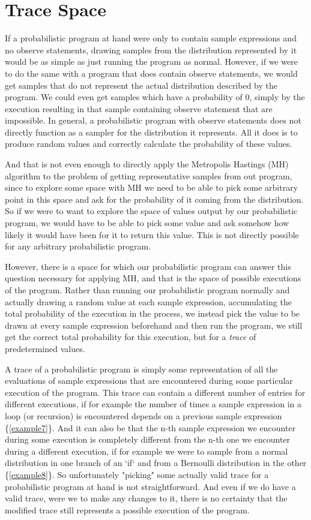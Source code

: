 \section{Trace Space}

If a probabilistic program at hand were only to contain sample expressions and no observe statements, drawing samples from the distribution represented by it would be as simple as just running the program as normal. However, if we were to do the same with a program that does contain observe statements, we would get samples that do not represent the actual distribution described by the program. We could even get samples which have a probability of $0$, simply by the execution resulting in that sample containing observe statement that are impossible. In general, a probabilistic program with observe statements does not directly function as a sampler for the distribution it represents. All it does is to produce random values and correctly calculate the probability of these values.

And that is not even enough to directly apply the Metropolis Hastings (MH) algorithm to the problem of getting representative samples from out program, since to explore some space with MH we need to be able to pick some arbitrary point in this space and ask for the probability of it coming from the distribution. So if we were to want to explore the space of values output by our probabilistic program, we would have to be able to pick some value and ask somehow how likely it would have been for it to return this value. This is not directly possible for any arbitrary probabilistic program.

However, there is a space for which our probabilistic program can answer this question necessary for applying MH, and that is the space of possible executions of the program. Rather than running our probabilistic program normally and actually drawing a random value at each sample expression, accumulating the total probability of the execution in the process, we instead pick the value to be drawn at every sample expression beforehand and then run the program, we still get the correct total probability for this execution, but for a \textit{trace} of predetermined values.

A trace of a probabilistic program is simply some representation of all the evaluations of sample expressions that are encountered during some particular execution of the program. This trace can contain a different number of entries for different executions, if for example the number of times a sample expression in a loop (or recursion) is encountered depends on a previous sample expression \{\ref{example7}\}. And it can also be that the n-th sample expression we encounter during some execution is completely different from the n-th one we encounter during a different execution, if for example we were to sample from a normal distribution in one branch of an `if` and from a Bernoulli distribution in the other \{\ref{example8}\}. So unfortunately "picking" some actually valid trace for a probabilistic program at hand is not straightforward. And even if we do have a valid trace, were we to make any changes to it, there is no certainty that the modified trace still represents a possible execution of the program.

